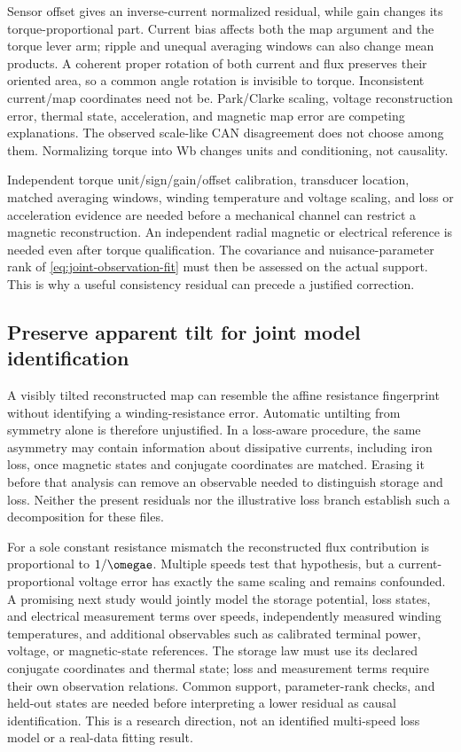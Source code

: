 Sensor offset gives an inverse-current normalized residual, while gain
changes its torque-proportional part. Current bias affects both the map
argument and the torque lever arm; ripple and unequal averaging windows
can also change mean products. A coherent proper rotation of both current
and flux preserves their oriented area, so a common angle rotation is
invisible to torque. Inconsistent current/map coordinates need not be.
Park/Clarke scaling, voltage reconstruction error, thermal state,
acceleration, and magnetic map error are competing explanations.
The observed scale-like CAN disagreement does not choose among them.
Normalizing torque into Wb changes units and conditioning, not causality.

Independent torque unit/sign/gain/offset calibration, transducer location,
matched averaging windows, winding temperature and voltage scaling, and
loss or acceleration evidence are needed before a mechanical channel
can restrict a magnetic reconstruction. An independent radial magnetic
or electrical reference is needed even after torque qualification.
The covariance and nuisance-parameter rank of \cref{eq:joint-observation-fit}
must then be assessed on the actual support. This is why a useful
consistency residual can precede a justified correction.

\subsection{Preserve apparent tilt for joint model identification}
A visibly tilted reconstructed map can resemble the affine resistance
fingerprint without identifying a winding-resistance error. Automatic
untilting from symmetry alone is therefore unjustified. In a loss-aware
procedure, the same asymmetry may contain information about dissipative
currents, including iron loss, once magnetic states and conjugate coordinates
are matched. Erasing it before that analysis can remove an observable needed
to distinguish storage and loss. Neither the present residuals nor the
illustrative loss branch establish such a decomposition for these files.

For a sole constant resistance mismatch the reconstructed flux contribution
is proportional to $1/\omegae$. Multiple speeds test that hypothesis, but a
current-proportional voltage error has exactly the same scaling and remains
confounded. A promising next study would jointly model the storage potential,
loss states, and electrical measurement terms over speeds, independently
measured winding temperatures, and additional observables such as calibrated
terminal power, voltage, or magnetic-state references. The storage law must
use its declared conjugate coordinates and thermal state; loss and measurement
terms require their own observation relations. Common support, parameter-rank
checks, and held-out states are needed before interpreting a lower residual
as causal identification. This is a research direction, not an identified
multi-speed loss model or a real-data fitting result.
